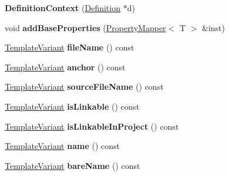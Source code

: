 \begin{DoxyCompactItemize}
\item 
\mbox{\label{class_definition_context_aa3e74d6a17ccd5f9333e05949740d7c2}} 
{\bfseries Definition\+Context} (\mbox{\hyperlink{class_definition}{Definition}} $\ast$d)
\item 
\mbox{\label{class_definition_context_a8dfaadb8e2eb3a0a4505b79e050d15c9}} 
void {\bfseries add\+Base\+Properties} (\mbox{\hyperlink{class_property_mapper}{Property\+Mapper}}$<$ T $>$ \&inst)
\item 
\mbox{\label{class_definition_context_a474dd7e0b323f1fd04a1902bcd0ac167}} 
\mbox{\hyperlink{class_template_variant}{Template\+Variant}} {\bfseries file\+Name} () const
\item 
\mbox{\label{class_definition_context_a667f016463076fc8281b046bd41b087f}} 
\mbox{\hyperlink{class_template_variant}{Template\+Variant}} {\bfseries anchor} () const
\item 
\mbox{\label{class_definition_context_ab63d36b8937861676e9a4b406ecd216b}} 
\mbox{\hyperlink{class_template_variant}{Template\+Variant}} {\bfseries source\+File\+Name} () const
\item 
\mbox{\label{class_definition_context_a2d8fa6a755a9bffe893741ef2cea0099}} 
\mbox{\hyperlink{class_template_variant}{Template\+Variant}} {\bfseries is\+Linkable} () const
\item 
\mbox{\label{class_definition_context_a2cd481eca85fc417c88df458afa9fd8b}} 
\mbox{\hyperlink{class_template_variant}{Template\+Variant}} {\bfseries is\+Linkable\+In\+Project} () const
\item 
\mbox{\label{class_definition_context_a49113fda21703caae46bc2ceff94eee9}} 
\mbox{\hyperlink{class_template_variant}{Template\+Variant}} {\bfseries name} () const
\item 
\mbox{\label{class_definition_context_a60a574a0efd2786ed401f7febf02c84c}} 
\mbox{\hyperlink{class_template_variant}{Template\+Variant}} {\bfseries bare\+Name} () const

\end{DoxyCompactItemize}
